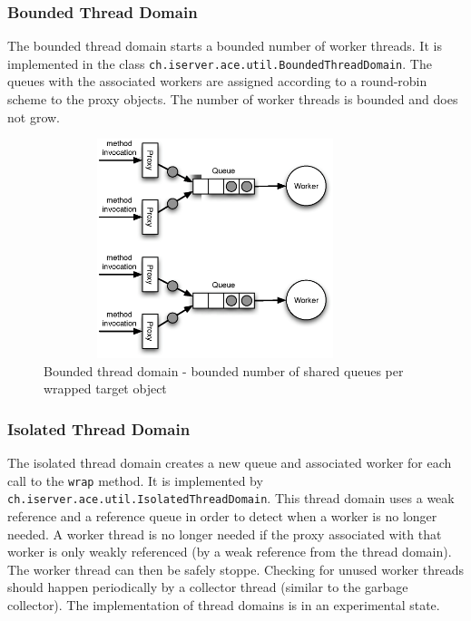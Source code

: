 \subsubsection{Bounded Thread Domain}
The bounded thread domain starts a bounded number of worker threads. It
is implemented in the class \texttt{ch.iserver.ace.util.BoundedThreadDomain}.
The queues with the associated workers are assigned according to
a round-robin scheme to the proxy objects. The number of worker threads
is bounded and does not grow.

\begin{figure}[H]
 \centering
 \includegraphics[width=10cm,height=6.4cm]{../images/finalreport/threaddomain_bounded.eps}
 \caption{Bounded thread domain - bounded number of shared queues per wrapped target object}
\end{figure}

\subsubsection{Isolated Thread Domain}
The isolated thread domain creates a new queue and associated worker
for each call to the \texttt{wrap} method. It is implemented by
\texttt{ch.iserver.ace.util.IsolatedThreadDomain}. This thread domain
uses a weak reference and a reference queue in order to detect when
a worker is no longer needed. A worker thread is no longer needed if the
proxy associated with that worker is only weakly referenced (by a weak
reference from the thread domain). The worker thread can then be
safely stoppe. Checking for unused worker threads should happen 
periodically by a collector thread (similar to the garbage collector). The
implementation of thread domains is in an experimental state.

